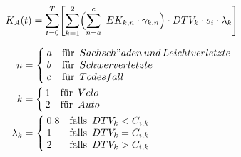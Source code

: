 \begin{equation}
K_{A}(t) = \sum_{t=0}^T \Biggl[ \sum_{k=1}^2 \Bigl( \sum_{n=a}^c \ EK_{k,n} \cdot \gamma_{k,n} \Bigr) \cdot DTV_{k} \cdot s_i \cdot \lambda_{k} \Biggr] 
\label{equation:8}
\end{equation}

\begin{align*}
      n &=
      \begin{cases}
        \begin{aligned}
          & a  \\
          & b \\
          & c
        \end{aligned} &
        \begin{aligned}
         & \text{für}\ \thinspace \\
         & \text{für}\ \thinspace \\
         & \text{für}\ \thinspace
        \end{aligned}
        \begin{aligned}
          & {Sachsch"aden\,und\,Leichtverletzte} \\
          & {Schwerverletzte} \\
          & {Todesfall}
        \end{aligned}
      \end{cases}  \\
      k &=
      \begin{cases}
        \begin{aligned}
          & 1 \\
          & 2
        \end{aligned} &
        \begin{aligned}
         & \text{für}\ \thinspace \\
         & \text{für}\ \thinspace
        \end{aligned}
        \begin{aligned}
          & Velo \\
          & Auto
        \end{aligned}
      \end{cases} \\
      \lambda_{k} &=
      \begin{cases}
        \begin{aligned}
          & 0.8  \\
          & 1 \\
          & 2
        \end{aligned} &
        \begin{aligned}
         & \text{falls}\ \thinspace \\
         & \text{falls}\ \thinspace \\
         & \text{falls}\ \thinspace
        \end{aligned}
        \begin{aligned}
          & DTV_{k} < C_{i,k} \\
          & DTV_{k} = C_{i,k} \\
          & DTV_{k} > C_{i,k}
        \end{aligned}
      \end{cases}
\end{align*}

